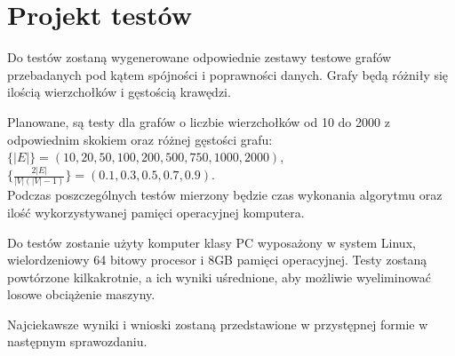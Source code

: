 \documentclass[a4paper, 10pt]{article}
\begin{document}
\section{Projekt testów}

Do testów zostaną wygenerowane odpowiednie zestawy testowe grafów przebadanych 
pod kątem spójności i poprawności danych. Grafy będą różniły się ilością wierzchołków i gęstością krawędzi.

Planowane, są testy dla grafów o liczbie wierzchołków od 10 do 2000 z odpowiednim skokiem oraz różnej gęstości grafu:\\
$\{|E|\}=(10, 20, 50, 100, 200, 500, 750, 1000,2000)$, \\ $\{\frac{2|E|}{|V|(|V|-1)}\}= (0.1,0.3,0.5,0.7,0.9)$. \\
Podczas poszczególnych testów mierzony będzie czas wykonania algorytmu oraz ilość wykorzystywanej pamięci operacyjnej komputera.

Do testów zostanie użyty komputer klasy PC wyposażony w system Linux, wielordzeniowy 64 bitowy procesor i 8GB pamięci operacyjnej. Testy zostaną powtórzone kilkakrotnie, a ich wyniki uśrednione, 
aby możliwie wyeliminować losowe obciążenie maszyny.

Najciekawsze wyniki i wnioski zostaną przedstawione w przystępnej formie w następnym sprawozdaniu.




	





\nocite{*}
\renewcommand\refname{\section{Bibliografia}}

\end{document}
